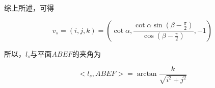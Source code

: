 综上所述，可得

\begin{equation}
    v_s 
    = (i, j, k)
    = \left( 
            \cot \alpha, 
            \frac{\cot\alpha \sin\left(\beta - \frac{\pi}{2}\right)}{\cos\left(\beta-\frac{\pi}{2}\right)},
            -1
            \right)
\end{equation}

所以，$l_s$与平面$ABEF$的夹角为

\begin{equation}
    <l_s, ABEF> = \arctan\frac{k}{\sqrt{i^2+j^2}}
\end{equation}

